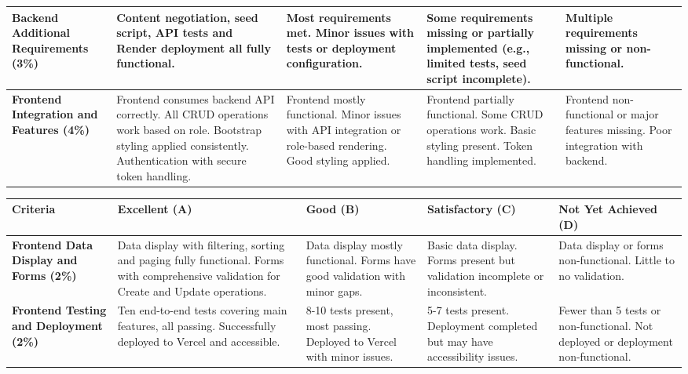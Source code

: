 \documentclass{article}
\begin{document}
\begin{landscape}
\begin{tabular}{|p{5cm}|p{4cm}|p{4cm}|p{4cm}|p{4cm}|}
\textbf{Backend Additional Requirements (3\%)} & 
Content negotiation, seed script, API tests and Render deployment all fully functional. & 
Most requirements met. Minor issues with tests or deployment configuration. & 
Some requirements missing or partially implemented (e.g., limited tests, seed script incomplete). & 
Multiple requirements missing or non-functional. \\ \hline

\textbf{Frontend Integration and Features (4\%)} & 
Frontend consumes backend API correctly. All CRUD operations work based on role. Bootstrap styling applied consistently. Authentication with secure token handling. & 
Frontend mostly functional. Minor issues with API integration or role-based rendering. Good styling applied. & 
Frontend partially functional. Some CRUD operations work. Basic styling present. Token handling implemented. & 
Frontend non-functional or major features missing. Poor integration with backend. \\ \hline

\end{tabular}


\begin{tabular}{|p{5cm}|p{4cm}|p{4cm}|p{4cm}|p{4cm}|}
\hline
\textbf{Criteria} & \textbf{Excellent (A)} & \textbf{Good (B)} & \textbf{Satisfactory (C)} & \textbf{Not Yet Achieved (D)} \\ \hline

\textbf{Frontend Data Display and Forms (2\%)} & 
Data display with filtering, sorting and paging fully functional. Forms with comprehensive validation for Create and Update operations. & 
Data display mostly functional. Forms have good validation with minor gaps. & 
Basic data display. Forms present but validation incomplete or inconsistent. & 
Data display or forms non-functional. Little to no validation. \\ \hline

\textbf{Frontend Testing and Deployment (2\%)} & 
Ten end-to-end tests covering main features, all passing. Successfully deployed to Vercel and accessible. & 
8-10 tests present, most passing. Deployed to Vercel with minor issues. & 
5-7 tests present. Deployment completed but may have accessibility issues. & 
Fewer than 5 tests or non-functional. Not deployed or deployment non-functional. \\ \hline

\end{tabular}


\end{landscape}
\end{document}
